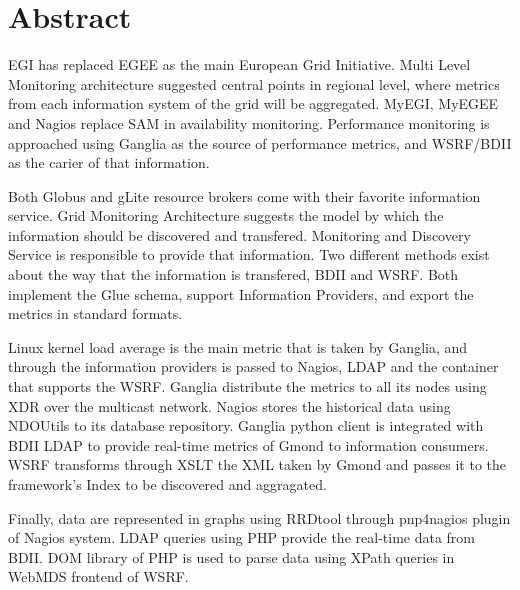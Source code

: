 \section*{Abstract}

EGI has replaced EGEE as the main European Grid Initiative. Multi Level Monitoring architecture suggested central points in regional level, where metrics from each information system of the grid will be aggregated. MyEGI, MyEGEE and Nagios replace SAM in availability monitoring. Performance monitoring is approached using Ganglia as the source of performance metrics, and WSRF/BDII as the carier of that information.

Both Globus and gLite resource brokers come with their favorite information service. Grid Monitoring Architecture suggests the model by which the information should be discovered and transfered. Monitoring and Discovery Service is responsible to provide that information. Two different methods exist about the way that the information is transfered, BDII and WSRF. Both implement the Glue schema, support Information Providers, and export the metrics in standard formats.

Linux kernel load average is the main metric that is taken by Ganglia, and through the information providers is passed to Nagios, LDAP and the container that supports the WSRF. Ganglia distribute the metrics to all its nodes using XDR over the multicast network. Nagios stores the historical data using NDOUtils to its database repository. Ganglia python client is integrated with BDII LDAP to provide real-time metrics of Gmond to information consumers. WSRF transforms through XSLT the XML taken by Gmond and passes it to the framework's Index to be discovered and aggragated.

Finally, data are represented in graphs using RRDtool through pnp4nagios plugin of Nagios system. LDAP queries using PHP provide the real-time data from BDII. DOM library of PHP is used to parse data using XPath queries in WebMDS frontend of WSRF.

\newpage
